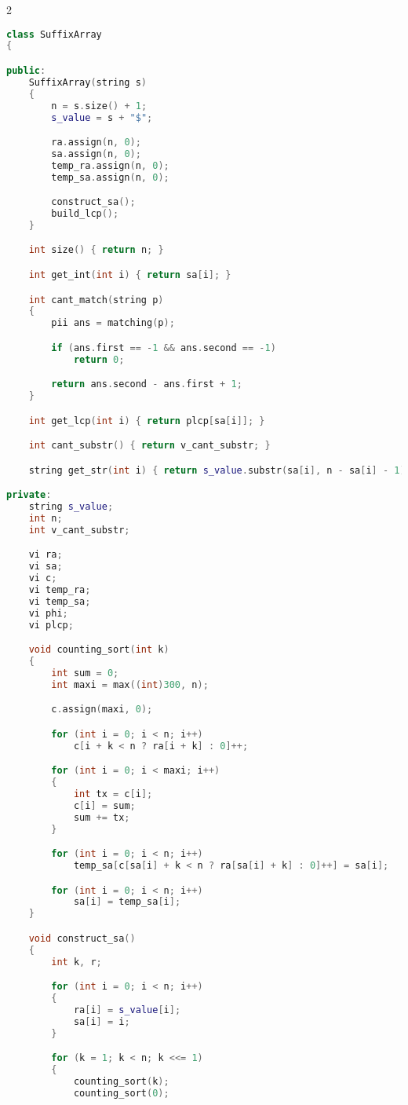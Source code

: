 \documentclass[leter]{amsart}
\begin{document}
\begin{multicols}{2}
\begin{lstlisting}[language=C++]
class SuffixArray
{

public:
    SuffixArray(string s)
    {
        n = s.size() + 1;
        s_value = s + "$";

        ra.assign(n, 0);
        sa.assign(n, 0);
        temp_ra.assign(n, 0);
        temp_sa.assign(n, 0);

        construct_sa();
        build_lcp();
    }

    int size() { return n; }

    int get_int(int i) { return sa[i]; }

    int cant_match(string p)
    {
        pii ans = matching(p);

        if (ans.first == -1 && ans.second == -1)
            return 0;

        return ans.second - ans.first + 1;
    }

    int get_lcp(int i) { return plcp[sa[i]]; }

    int cant_substr() { return v_cant_substr; }

    string get_str(int i) { return s_value.substr(sa[i], n - sa[i] - 1); }

private:
    string s_value;
    int n;
    int v_cant_substr;

    vi ra;
    vi sa;
    vi c;
    vi temp_ra;
    vi temp_sa;
    vi phi;
    vi plcp;

    void counting_sort(int k)
    {
        int sum = 0;
        int maxi = max((int)300, n);

        c.assign(maxi, 0);

        for (int i = 0; i < n; i++)
            c[i + k < n ? ra[i + k] : 0]++;

        for (int i = 0; i < maxi; i++)
        {
            int tx = c[i];
            c[i] = sum;
            sum += tx;
        }

        for (int i = 0; i < n; i++)
            temp_sa[c[sa[i] + k < n ? ra[sa[i] + k] : 0]++] = sa[i];

        for (int i = 0; i < n; i++)
            sa[i] = temp_sa[i];
    }

    void construct_sa()
    {
        int k, r;

        for (int i = 0; i < n; i++)
        {
            ra[i] = s_value[i];
            sa[i] = i;
        }

        for (k = 1; k < n; k <<= 1)
        {
            counting_sort(k);
            counting_sort(0);


\end{lstlisting}
\end{multicols}
\end{document}
